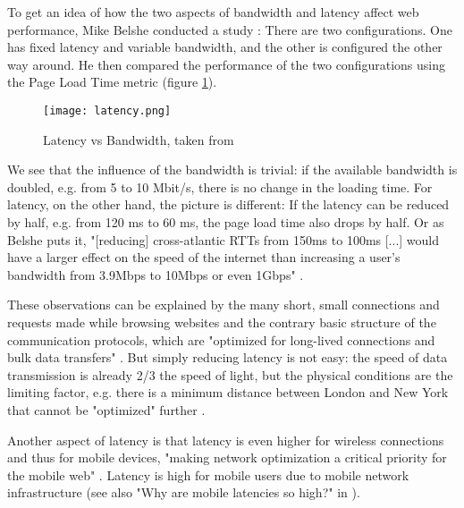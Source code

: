 To get an idea of how the two aspects of bandwidth and latency affect web performance, Mike Belshe conducted a study \cite{2010Belshe}:
There are two configurations. One has fixed latency and variable bandwidth, and the other is configured the other way around.
He then compared the performance of the two configurations using the Page Load Time metric (figure \ref{figure:latency}).


\begin{figure}[h!]
\begin{center}
\texttt{[image: latency.png]}
\caption[Latency vs Bandwidth]{Latency vs Bandwidth, taken from \cite{2013Grigorik}}
\label{figure:latency}
\end{center}
\end{figure}


We see that the influence of the bandwidth is trivial: if the available bandwidth is doubled, e.g. from 5 to 10 Mbit/s, there is no change in the loading time.
For latency, on the other hand, the picture is different: If the latency can be reduced by half, e.g. from 120 ms to 60 ms, the page load time also drops by half.
Or as Belshe puts it, "[reducing] cross-atlantic RTTs from 150ms to 100ms [...] would have a larger effect on the speed of the internet than increasing a user's bandwidth from 3.9Mbps to 10Mbps or even 1Gbps" \cite{2010Belshe}.

These observations can be explained by the many short, small connections and requests made while browsing websites and the contrary basic structure of the communication protocols, which are "optimized for long-lived connections and bulk data transfers" \cite{2013Grigorik}. %
But simply reducing latency is not easy: the speed of data transmission is already 2/3 the speed of light, but the physical conditions are the limiting factor, e.g. there is a minimum distance between London and New York that cannot be "optimized" further \cite{2013Grigorik}. %




Another aspect of latency is that latency is even higher for wireless connections and thus for mobile devices, "making network optimization a critical priority for the mobile web" \cite{2013Grigorik}. %
Latency is high for mobile users due to mobile network infrastructure (see also "Why are mobile latencies so high?" in \cite{2013Grigorik}).


